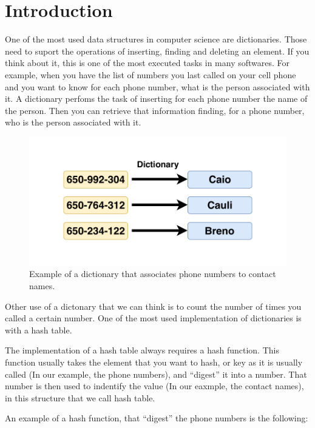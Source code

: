 \chapter{Introduction}
\label{cap:Introduction}

One of the most used data structures in computer science are dictionaries. Those need to suport the operations of inserting, finding and deleting an element. If you think about it, this is one of the most executed tasks in many softwares. For example, when you have the list of numbers you last called on your cell phone and you want to know for each phone number, what is the person associated with it. A dictionary perfoms the task of inserting for each phone number the name of the person. Then you can retrieve that information finding, for a phone number, who is the person associated with it.


\begin{figure}[h!]
  \centering
  \includegraphics[width=12cm]{figuras/dictionary-example.pdf}
  \caption{Example of a dictionary that associates phone numbers to contact names. }
\end{figure}

Other use of a dictonary that we can think is to count the number of times you called a certain number. One of the most used implementation of dictionaries is with a hash table.

The implementation of a hash table always requires a hash function. This function usually takes the element that you want to hash, or key as it is usually called (In our example, the phone numbers), and ``digest'' it into a number. That number is then used to indentify the value (In our eaxmple, the contact names), in this structure that we call hash table.

An example of a hash function, that ``digest'' the phone numbers is the following: \\


